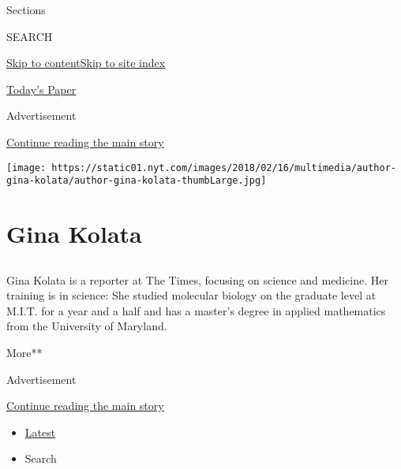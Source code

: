 Sections

SEARCH

\protect\hyperlink{site-content}{Skip to
content}\protect\hyperlink{site-index}{Skip to site index}

\href{https://myaccount.nytimes.com/auth/login?response_type=cookie\&client_id=vi}{}

\href{https://www.nytimes.com/section/todayspaper}{Today's Paper}

Advertisement

\protect\hyperlink{after-top}{Continue reading the main story}

\texttt{[image: https://static01.nyt.com/images/2018/02/16/multimedia/author-gina-kolata/author-gina-kolata-thumbLarge.jpg]}

\hypertarget{gina-kolata}{%
\section{Gina Kolata}\label{gina-kolata}}

\subsection{}

Gina Kolata is a reporter at The Times, focusing on science and
medicine. Her training is in science: She studied molecular biology on
the graduate level at M.I.T. for a year and a half and has a master's
degree in applied mathematics from the University of Maryland.

More**

Advertisement

\protect\hyperlink{after-mid1}{Continue reading the main story}

\begin{itemize}
\tightlist
\item
  \protect\hyperlink{stream-panel}{Latest}
\item
  Search
\end{itemize}

